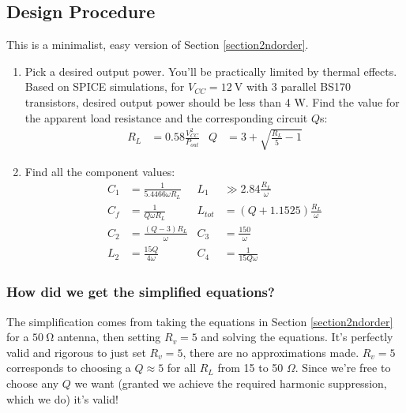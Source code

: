 \documentclass[10pt,letterpaper]{article}
\begin{document}
\subsection*{Design Procedure}
This is a minimalist, easy version of Section \ref{section2ndorder}.
\begin{enumerate}
\item Pick a desired output power. You'll be practically limited by thermal effects. Based on SPICE simulations, for $V_{CC}=\SI{12}{\volt}$ with 3 parallel BS170 transistors, desired output power should be less than 4 W. Find the value for the apparent load resistance and the corresponding circuit $Q$s:
\begin{align*}
R_L&=0.58\frac{V_{CC}^2}{P_{out}} &
Q&=3+\sqrt{\frac{R_L}{5}-1} 
\end{align*}
%


\item Find all the component values:
\begin{align*}
C_1&=\frac{1}{5.4466 \omega R_L} & L_1&\gg 2.84\frac{R_L}{\omega} \\
C_f&=\frac{1}{Q\omega R_L} &
L_{tot}&=(Q+1.1525)\frac{R_L}{\omega} \\
C_2&=\frac{(Q-3)R_L}{\omega} &
C_3&=\frac{150}{\omega}\\
L_2&=\frac{15 Q }{4\omega} &
C_4 &= \frac{1}{15 Q \omega}
\end{align*}
\end{enumerate}
\subsubsection*{How did we get the simplified equations?}
The simplification comes from taking the equations in Section \ref{section2ndorder} for a $\SI{50}{\ohm}$ antenna, then setting $R_v=5$ and solving the equations. It's perfectly valid and rigorous to just set $R_v=5$, there are no approximations made. $R_v=5$ corresponds to choosing a $Q\approx 5$ for all $R_L$ from 15 to 50 $\Omega$. Since we're free to choose any $Q$ we want (granted we achieve the required harmonic suppression, which we do) it's valid!
\end{document}
